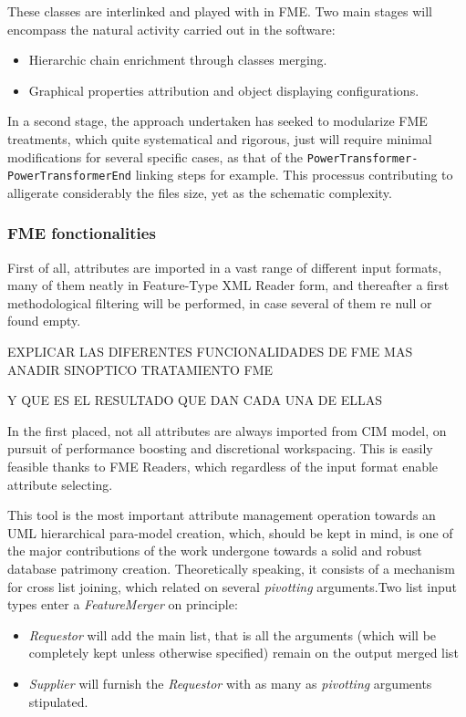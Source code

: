 These classes are interlinked and played with in FME. Two main stages will encompass the natural activity carried out in the software:
\begin{itemize}
    \item Hierarchic chain enrichment through classes merging.
    \item Graphical properties attribution and object displaying configurations.
\end{itemize}

In a second stage, the approach undertaken has seeked to modularize FME treatments, which quite systematical and rigorous, just will require minimal modifications for several specific cases, as that of the \texttt{PowerTransformer-PowerTransformerEnd} linking steps for example. This processus contributing to alligerate considerably the files size, yet as the schematic complexity.

\subsubsection{FME fonctionalities}
\label{subsub:AIG:data-management:FME-fonct}

First of all, attributes are imported in a vast range of different input formats, many of them neatly in Feature-Type XML Reader form, and thereafter a first methodological filtering will be performed, in case several of them re null or found empty.

EXPLICAR LAS DIFERENTES FUNCIONALIDADES DE FME MAS ANADIR SINOPTICO TRATAMIENTO FME

Y QUE ES EL RESULTADO QUE DAN CADA UNA DE ELLAS


In the first placed, not all attributes are always imported from CIM model, on pursuit of performance boosting and discretional workspacing. This is easily feasible thanks to FME Readers, which regardless of the input format enable attribute selecting.


This tool is the most important attribute management operation towards an UML hierarchical para-model creation, which, should be kept in mind, is one of the major contributions of the work undergone towards a solid and robust database patrimony creation. Theoretically speaking, it consists of a mechanism for cross list joining, which related on several \textit{pivotting} arguments.Two list input types enter a \textit{FeatureMerger} on principle: 
\begin{itemize}
    \item \textit{Requestor} will add the main list, that is all the arguments (which will be completely kept unless otherwise specified) remain on the output merged list
    \item \textit{Supplier} will furnish the \textit{Requestor} with as many as \textit{pivotting} arguments stipulated.
\end{itemize}

